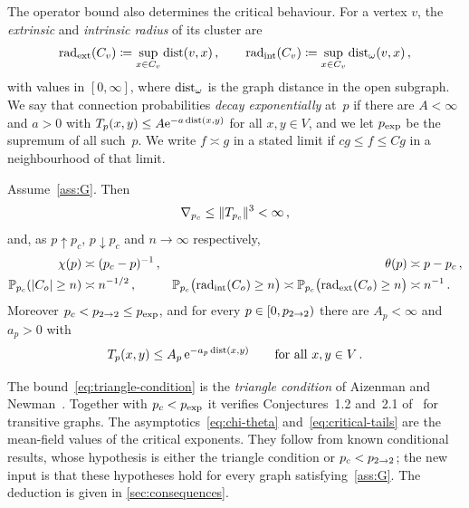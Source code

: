The operator bound also determines the critical behaviour. For a vertex $v$, the \emph{extrinsic} and
\emph{intrinsic radius} of its cluster are
\begin{equation*}
  \operatorname{rad}_{\mathrm{ext}}(C_v)\coloneqq\sup_{x\in C_v}\operatorname{dist}(v,x)\,,\qquad
  \operatorname{rad}_{\mathrm{int}}(C_v)\coloneqq\sup_{x\in C_v}\operatorname{dist}_\omega(v,x)\,,
\end{equation*}
with values in $[0,\infty]$, where $\operatorname{dist}_\omega$ is the graph distance in the open subgraph. We say
that connection probabilities \emph{decay exponentially} at~$p$ if there are $A<\infty$ and $a>0$ with
$T_p(x,y)\le A\mathrm{e}^{-a\operatorname{dist}(x,y)}$ for all $x,y\in V$, and we let $p_{\mathrm{exp}}$ be the supremum of all such~$p$.
We write $f\asymp g$ in a stated limit if $cg\le f\le Cg$ in a neighbourhood of that limit.

\begin{theorem}\label{thm:consequences}
Assume~\cref{ass:G}. Then
\begin{equation}\label{eq:triangle-condition}
  \nabla_{p_c}\le\lVert T_{p_c}\rVert^3<\infty\,,
\end{equation}
and, as $p\uparrow p_c$, $p\downarrow p_c$ and $n\to\infty$ respectively,
\begin{align}
  \chi(p)&\asymp(p_c-p)^{-1}\,,&
  \theta(p)&\asymp p-p_c\,,\label{eq:chi-theta}\\
  \mathbb P_{p_c}(\lvert C_o\rvert\ge n)&\asymp n^{-1/2}\,,&
  \mathbb P_{p_c}\bigl(\operatorname{rad}_{\mathrm{int}}(C_o)\ge n\bigr)\asymp\mathbb P_{p_c}\bigl(\operatorname{rad}_{\mathrm{ext}}(C_o)\ge n\bigr)&\asymp n^{-1}\,.
  \label{eq:critical-tails}
\end{align}
Moreover $p_c<p_{2\to 2}\le p_{\mathrm{exp}}$, and for every $p\in[0,p_{2\to 2})$ there are $A_p<\infty$ and $a_p>0$ with
\begin{equation}\label{eq:exp-decay}
  T_p(x,y)\le A_p\,\mathrm{e}^{-a_p\operatorname{dist}(x,y)}\qquad\text{for all }x,y\in V\,.
\end{equation}
\end{theorem}

The bound~\eqref{eq:triangle-condition} is the \emph{triangle condition} of Aizenman and
Newman~\cite{AN84}. Together with $p_c<p_{\mathrm{exp}}$ it verifies Conjectures~1.2 and~2.1 of~\cite{Hut20L2} for
transitive graphs. The asymptotics~\eqref{eq:chi-theta} and~\eqref{eq:critical-tails} are the
mean-field values of the critical exponents. They follow from known conditional results, whose
hypothesis is either the triangle condition or $p_c<p_{2\to 2}$; the new input is that these hypotheses hold
for every graph satisfying~\cref{ass:G}. The deduction is given in \cref{sec:consequences}.

